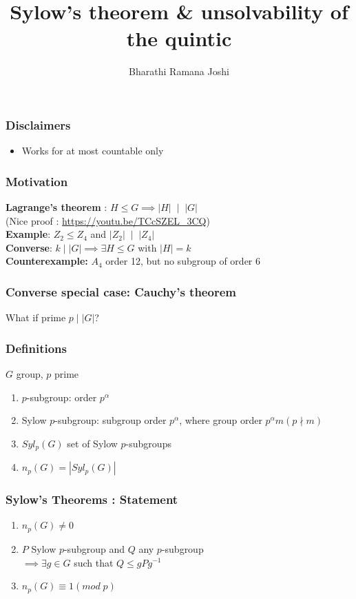 \documentclass{beamer}
\title{Sylow's theorem \& unsolvability of the quintic}
\author{Bharathi Ramana Joshi}
\begin{document}
\maketitle
\begin{frame}
    \frametitle{Disclaimers}
    \begin{itemize}
        \item Works for at most countable only
    \end{itemize}
\end{frame}
\begin{frame}
    \frametitle{Motivation}
    \textbf{Lagrange's theorem} : $H\leq G\implies |H|\;\mid\;|G|$\\
    (Nice proof : \url{https://youtu.be/TCcSZEL_3CQ})\\
    \textbf{Example}: $Z_2\leq Z_4$ and $|Z_2|\;\mid\;|Z_4|$\\
    \vspace{20pt}
    \textbf{Converse}: $k\mid|G|\implies\exists H\leq G$ with $|H| = k$\\
    \textbf{Counterexample:} $A_4$ order 12, but no subgroup of order 6
\end{frame}

\begin{frame}
    \frametitle{Converse special case: Cauchy's theorem}
    What if prime $p\mid|G|$?
\end{frame}

\begin{frame}
    \frametitle{Definitions}
    $G$ group, $p$ prime
    \begin{enumerate}
        \item $p$-subgroup: order $p^\alpha$
        \item Sylow $p$-subgroup: subgroup order $p^\alpha$, where group order
            $p^\alpha m (p\nmid m)$
        \item $Syl_p(G)$ set of Sylow $p$-subgroups
        \item $n_p(G) = |Syl_p(G)|$
    \end{enumerate}
\end{frame}

\begin{frame}
    \frametitle{Sylow's Theorems : Statement}
    \begin{enumerate}
        \item $n_p(G) \neq 0$
        \item $P$ Sylow $p$-subgroup and $Q$ any $p$-subgroup\\
            $\implies\exists g\in G$ such that $Q\leq gPg^{-1}$
        \item $n_p(G)\equiv 1(mod\; p)$
    \end{enumerate}
\end{frame}
\end{document}
